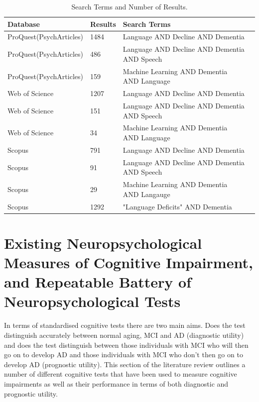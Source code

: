 \documentclass[10pt, letterpaper, twoside, openany]{book}
\begin{document}
\begin{table}[H]
	\begin{center}
	\begin{tabular}{ | p{4cm} | p{1cm} | p{6cm} | p{1cm} |}
		\hline
		Database & Results & Search Terms  \\ \hline
		ProQuest(PsychArticles) & 1484 & Language AND Decline AND Dementia \\ \hline
		ProQuest(PsychArticles) & 486  & Language AND Decline AND Dementia AND Speech \\ \hline
		ProQuest(PsychArticles) & 159 & Machine Learning AND Dementia AND Language \\ \hline
		Web of Science & 1207  & Language AND Decline AND Dementia   \\ \hline
		Web of Science & 151  & Language AND Decline AND Dementia AND Speech  \\ \hline
		Web of Science & 34 & Machine Learning AND Dementia AND Language \\ \hline
		Scopus & 791 & Language AND Decline AND Dementia  \\ \hline
		Scopus & 91 & Language AND Decline AND Dementia AND Speech   \\ \hline
		Scopus & 29 & Machine Learning AND Dementia AND Langauge \\ \hline
		Scopus & 1292 & "Language Deficits" AND Dementia \\ \hline
	\end{tabular}
	\end{center}
	\caption{\label{tab:table-name}Search Terms and Number of Results.}
\end{table}
\section{Existing Neuropsychological Measures of Cognitive Impairment, and Repeatable Battery of Neuropsychological Tests}
In terms of standardised cognitive tests there are two main aims. Does the test distinguish accurately between normal aging, MCI and AD (diagnostic utility) and does the test distinguish between those individuals with MCI who will then go on to develop AD and those individuals with MCI who don't then go on to develop AD (prognostic utility). This section of the literature review outlines a number of different cognitive tests that have been used to measure cognitive impairments as well as their performance in terms of both diagnostic and prognostic utility.
\par 
\end{document}
